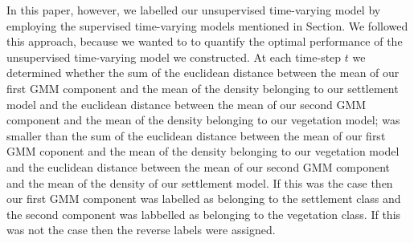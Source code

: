 \documentclass{article}
\begin{document}
In this paper, however, we labelled our unsupervised time-varying model by employing the supervised time-varying models mentioned in Section. We followed this approach, because 
we wanted to to quantify the optimal performance of the unsupervised time-varying model we constructed. At each time-step $t$ we 
determined whether the sum of the euclidean distance between the mean of our first GMM component and the mean of the density belonging to our settlement model and the euclidean distance 
between the mean of our second GMM component and the mean of the density belonging to our vegetation model; was smaller than the sum of the euclidean distance between the mean of our first GMM coponent and the mean of the density 
belonging to our vegetation model and the euclidean distance between the mean of our second GMM component and the mean of the density of our settlement model. If this was the case then our first GMM component 
was labelled as belonging to the settlement class and the second component was labbelled as belonging to the vegetation class. If this was not the case then 
the reverse labels were assigned.

% 


\end{document}
